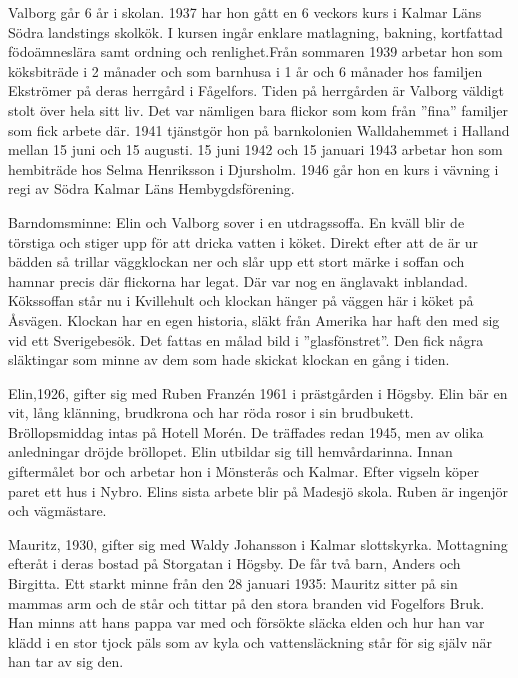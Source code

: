Valborg går 6 år i skolan. 1937 har hon gått en 6 veckors kurs i Kalmar Läns Södra landstings skolkök. I kursen ingår enklare matlagning, bakning, kortfattad födoämneslära samt ordning och renlighet.Från sommaren 1939 arbetar hon som köksbiträde i 2 månader och som barnhusa i 1 år och 6 månader hos familjen Ekströmer på deras herrgård i Fågelfors. Tiden på herrgården är Valborg väldigt stolt över hela sitt liv. Det var nämligen bara flickor som kom från ”fina” familjer som fick arbete där. 1941 tjänstgör hon på barnkolonien Walldahemmet i Halland mellan 15 juni och 15 augusti. 15 juni 1942 och 15 januari 1943 arbetar hon som hembiträde hos Selma Henriksson i Djursholm. 1946 går hon en kurs i vävning i regi av Södra Kalmar Läns Hembygdsförening.








Barndomsminne: Elin och Valborg sover i en utdragssoffa. En kväll blir de törstiga och stiger upp för att dricka vatten i köket. Direkt efter att de är ur bädden så trillar väggklockan ner och slår upp ett stort märke i soffan och hamnar precis där flickorna har legat. Där var nog en änglavakt inblandad.
Kökssoffan står nu i Kvillehult och klockan hänger på väggen här i köket på Åsvägen. Klockan har en egen historia, släkt från Amerika har haft den med sig vid ett Sverigebesök. Det fattas en målad bild i ”glasfönstret”. Den fick några släktingar som minne av dem som hade skickat klockan en gång i tiden.


  
Elin,1926, gifter sig med Ruben Franzén 1961 i prästgården i Högsby.  Elin bär en vit, lång klänning, brudkrona och har röda rosor i sin brudbukett. Bröllopsmiddag intas på Hotell Morén. De träffades redan 1945, men av olika anledningar dröjde bröllopet. Elin utbildar sig till hemvårdarinna. Innan giftermålet bor och arbetar  hon i Mönsterås och Kalmar. Efter vigseln köper paret ett hus i Nybro. Elins sista arbete blir på Madesjö skola. Ruben är ingenjör och vägmästare.


Mauritz, 1930, gifter sig med Waldy Johansson i Kalmar slottskyrka. Mottagning efteråt i deras bostad på Storgatan i Högsby. De får två barn, Anders och Birgitta.
Ett starkt minne från den 28 januari 1935: Mauritz sitter på sin mammas arm och de står och tittar på den stora branden vid Fogelfors Bruk. Han minns att hans pappa var med och försökte släcka elden och hur han var klädd i en stor tjock päls som av kyla och vattensläckning står för sig själv när han tar av sig den.


